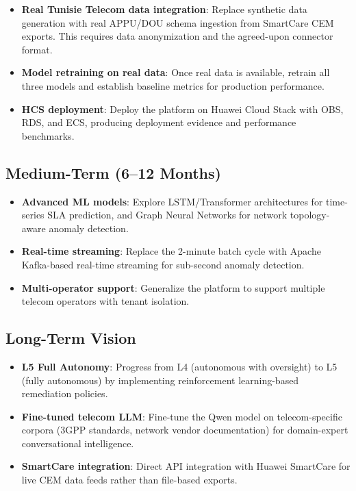 \begin{itemize}
    \item \textbf{Real Tunisie Telecom data integration}: Replace synthetic data generation with real APPU/DOU schema ingestion from SmartCare CEM exports. This requires data anonymization and the agreed-upon connector format.
    \item \textbf{Model retraining on real data}: Once real data is available, retrain all three models and establish baseline metrics for production performance.
    \item \textbf{HCS deployment}: Deploy the platform on Huawei Cloud Stack with OBS, RDS, and ECS, producing deployment evidence and performance benchmarks.
\end{itemize}

\subsection{Medium-Term (6--12 Months)}

\begin{itemize}
    \item \textbf{Advanced ML models}: Explore LSTM/Transformer architectures for time-series SLA prediction, and Graph Neural Networks for network topology-aware anomaly detection.
    \item \textbf{Real-time streaming}: Replace the 2-minute batch cycle with Apache Kafka-based real-time streaming for sub-second anomaly detection.
    \item \textbf{Multi-operator support}: Generalize the platform to support multiple telecom operators with tenant isolation.
\end{itemize}

\subsection{Long-Term Vision}

\begin{itemize}
    \item \textbf{L5 Full Autonomy}: Progress from L4 (autonomous with oversight) to L5 (fully autonomous) by implementing reinforcement learning-based remediation policies.
    \item \textbf{Fine-tuned telecom LLM}: Fine-tune the Qwen model on telecom-specific corpora (3GPP standards, network vendor documentation) for domain-expert conversational intelligence.
    \item \textbf{SmartCare integration}: Direct API integration with Huawei SmartCare for live CEM data feeds rather than file-based exports.
\end{itemize}

